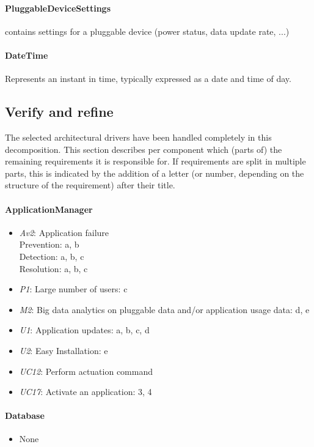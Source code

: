    \paragraph{PluggableDeviceSettings}
              contains settings for a pluggable device (power status,
              data update rate, ...)
    \paragraph{DateTime}
               Represents an instant in time, typically expressed as a date and time of day.


\subsection{Verify and refine}
    \noindent The selected architectural drivers have been handled completely
    in this decomposition.
    This section describes per component which (parts of) the remaining
    requirements it is responsible for. If requirements are split in
    multiple parts, this is indicated by the addition of a letter
    (or number, depending on the structure of the requirement) after their title.

    \paragraph{ApplicationManager}
        \begin{itemize}
            \item \emph{Av2}: Application failure \\
                   Prevention: a, b \\
                   Detection: a, b, c \\
                   Resolution: a, b, c
           \item \emph{P1}: Large number of users: c
           \item \emph{M2}: Big data analytics on pluggable data and/or application usage data: d, e
           \item \emph{U1}: Application updates: a, b, c, d
           \item \emph{U2}: Easy Installation: e
           \item \emph{UC12}: Perform actuation command
           \item \emph{UC17}: Activate an application: 3, 4
        \end{itemize}

    \paragraph{Database}
        \begin{itemize}
          	\item None
        \end{itemize}

